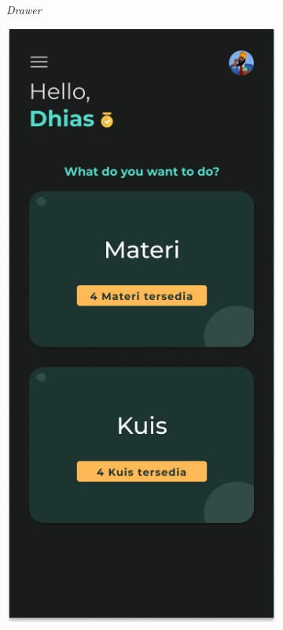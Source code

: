 \begin{figure}[H]
\begin{subfigure}[b]{0.23\textwidth}
	  \caption{\textit{Drawer}}
	  \label{fig:HasilMainDash2}
	\end{subfigure}
	\begin{subfigure}[b]{0.23\textwidth}
		\centering
	  \includegraphics[width=\linewidth]{contents/chapter-3/images/HF-Main-dt.png}

\end{subfigure}
\end{figure}
